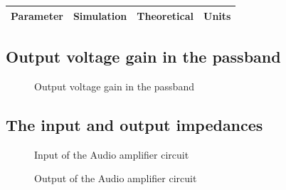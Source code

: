 \hfill
 \parbox{1\linewidth}{
  \centering
  \begin{tabular}{|l|l|l|r|}
    \hline    
    {\bf Parameter} & {\bf Simulation} & {\bf Theoretical } & {\bf Units }\\ \hline
    
  \end{tabular}
  \label{tab:results}
  }

  

\subsection{Output voltage gain in the passband}

\par
\begin{figure}[H] \centering
\caption{Output voltage gain in the passband}
\label{fig:gain_sim}
\end{figure}


\subsection{The input and output impedances}

\par
\begin{figure}[H] \centering
\caption{Input of the Audio amplifier circuit}
\label{fig:In_imp}
\end{figure}


\par
\begin{figure}[H] \centering
\caption{Output of the Audio amplifier circuit}
\label{fig:out_imp}
\end{figure}


\pagebreak
